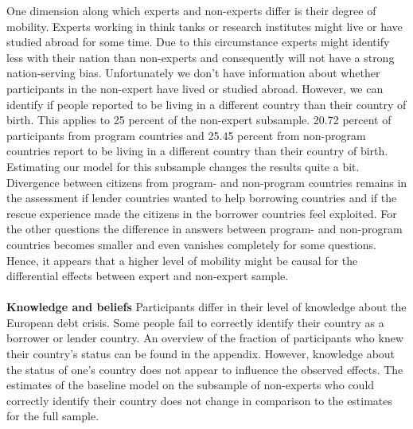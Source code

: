 \documentclass[12pt]{article}
\begin{document}
One dimension along which experts and non-experts differ is their degree of mobility. Experts working in think tanks or research institutes might live or have studied abroad for some time. Due to this circumstance experts might identify less with their nation than non-experts and consequently will not have a strong nation-serving bias. Unfortunately we don't have information about whether participants in the non-expert have lived or studied abroad. However, we can identify if people reported to be living in a different country than their country of birth. This applies to 25 percent of the non-expert subsample. 20.72 percent of participants from program countries and 25.45 percent from non-program countries report to be living in a different country than their country of birth. Estimating our model for this subsample changes the results quite a bit. Divergence between citizens from program- and non-program countries remains in the assessment if lender countries wanted to help borrowing countries and if the rescue experience made the citizens in the borrower countries feel exploited. For the other questions the difference in answers between program- and non-program countries becomes smaller and even vanishes completely for some questions. Hence, it appears that a higher level of mobility might be causal for the differential effects between expert and non-expert sample.  \\

\\
\textbf{Knowledge and beliefs} 
Participants differ in their level of knowledge about the European debt crisis. Some people fail to correctly identify their country as a borrower or lender country. An overview of the fraction of participants who knew their country's status can be found in the appendix. However, knowledge about the status of one's country does not appear to influence the observed effects. The estimates of the baseline model on the subsample of non-experts who could correctly identify their country does not change in comparison to the estimates for the full sample. 
\end{document}
